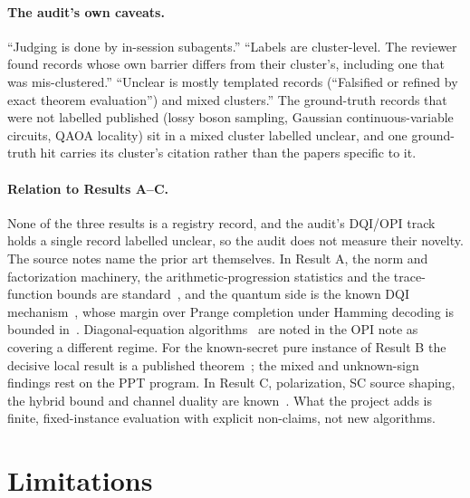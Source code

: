 \documentclass[10pt]{article}
\begin{document}
\paragraph{The audit's own caveats.} ``Judging is done by in-session subagents.'' ``Labels are cluster-level. The reviewer found records whose own barrier differs from their cluster's, including one that was mis-clustered.'' ``Unclear is mostly templated records (``Falsified or refined by exact theorem evaluation'') and mixed clusters.'' The ground-truth records that were not labelled published (lossy boson sampling, Gaussian continuous-variable circuits, QAOA locality) sit in a mixed cluster labelled unclear, and one ground-truth hit carries its cluster's citation rather than the papers specific to it.

\paragraph{Relation to Results A--C.} None of the three results is a registry record, and the audit's DQI/OPI track holds a single record labelled unclear, so the audit does not measure their novelty. The source notes name the prior art themselves. In Result A, the norm and factorization machinery, the arithmetic-progression statistics and the trace-function bounds are standard~\cite{KuoLiuTotani2026,BankBarySorokerRosenzweig2013,FouvryKowalskiMichel2014}, and the quantum side is the known DQI mechanism~\cite{JordanDQI2024,SunWootters2026}, whose margin over Prange completion under Hamming decoding is bounded in~\cite{MazumderNiroula2026}. Diagonal-equation algorithms~\cite{IvanyosSantha2015} are noted in the OPI note as covering a different regime. For the known-secret pure instance of Result B the decisive local result is a published theorem~\cite{VirmaniSacchiPlenioMarkham2001}; the mixed and unknown-sign findings rest on the PPT program. In Result C, polarization, SC source shaping, the hybrid bound and channel duality are known~\cite{Arikan2009,Arikan2010Source,HondaYamamoto2013,KoradaUrbanke2010,TalVardy2011,Renes2017,RengaswamyPfister2021}. What the project adds is finite, fixed-instance evaluation with explicit non-claims, not new algorithms.

\section{Limitations}
\label{sec:limits}
\end{document}
